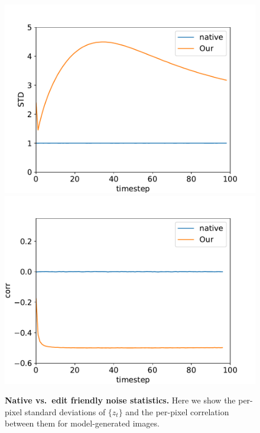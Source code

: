 \begin{figure}
\includegraphics[scale=0.28, trim={0.8cm 0cm 1.2cm 1cm},clip]{ICCV23_submission/figures/std_no_cycle_native.pdf}
\includegraphics[scale=0.28, trim={0cm 0cm 1.2cm 1.2cm},clip]{ICCV23_submission/figures/corr_no_cycle_native.pdf}
\caption{\textbf{Native vs.~edit friendly noise statistics.} Here we show the per-pixel standard deviations of $\{z_t\}$ and the per-pixel correlation between them for model-generated images.}
\label{fig:statistics_images}
\end{figure}


